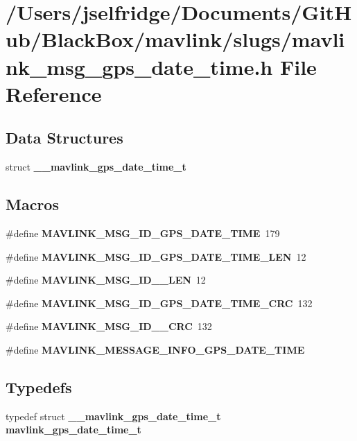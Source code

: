 \section{/\+Users/jselfridge/\+Documents/\+Git\+Hub/\+Black\+Box/mavlink/slugs/mavlink\+\_\+msg\+\_\+gps\+\_\+date\+\_\+time.h File Reference}
\label{mavlink__msg__gps__date__time_8h}
\subsection*{Data Structures}
\begin{DoxyCompactItemize}
\item 
struct \textbf{ \+\_\+\+\_\+mavlink\+\_\+gps\+\_\+date\+\_\+time\+\_\+t}
\end{DoxyCompactItemize}
\subsection*{Macros}
\begin{DoxyCompactItemize}
\item 
\#define \textbf{ M\+A\+V\+L\+I\+N\+K\+\_\+\+M\+S\+G\+\_\+\+I\+D\+\_\+\+G\+P\+S\+\_\+\+D\+A\+T\+E\+\_\+\+T\+I\+ME}~179
\item 
\#define \textbf{ M\+A\+V\+L\+I\+N\+K\+\_\+\+M\+S\+G\+\_\+\+I\+D\+\_\+\+G\+P\+S\+\_\+\+D\+A\+T\+E\+\_\+\+T\+I\+M\+E\+\_\+\+L\+EN}~12
\item 
\#define \textbf{ M\+A\+V\+L\+I\+N\+K\+\_\+\+M\+S\+G\+\_\+\+I\+D\+\_\+\_\+\+L\+EN}~12
\item 
\#define \textbf{ M\+A\+V\+L\+I\+N\+K\+\_\+\+M\+S\+G\+\_\+\+I\+D\+\_\+\+G\+P\+S\+\_\+\+D\+A\+T\+E\+\_\+\+T\+I\+M\+E\+\_\+\+C\+RC}~132
\item 
\#define \textbf{ M\+A\+V\+L\+I\+N\+K\+\_\+\+M\+S\+G\+\_\+\+I\+D\+\_\+\_\+\+C\+RC}~132
\item 
\#define \textbf{ M\+A\+V\+L\+I\+N\+K\+\_\+\+M\+E\+S\+S\+A\+G\+E\+\_\+\+I\+N\+F\+O\+\_\+\+G\+P\+S\+\_\+\+D\+A\+T\+E\+\_\+\+T\+I\+ME}
\end{DoxyCompactItemize}
\subsection*{Typedefs}
\begin{DoxyCompactItemize}
\item 
typedef struct \textbf{ \+\_\+\+\_\+mavlink\+\_\+gps\+\_\+date\+\_\+time\+\_\+t} \textbf{ mavlink\+\_\+gps\+\_\+date\+\_\+time\+\_\+t}
\end{DoxyCompactItemize}


